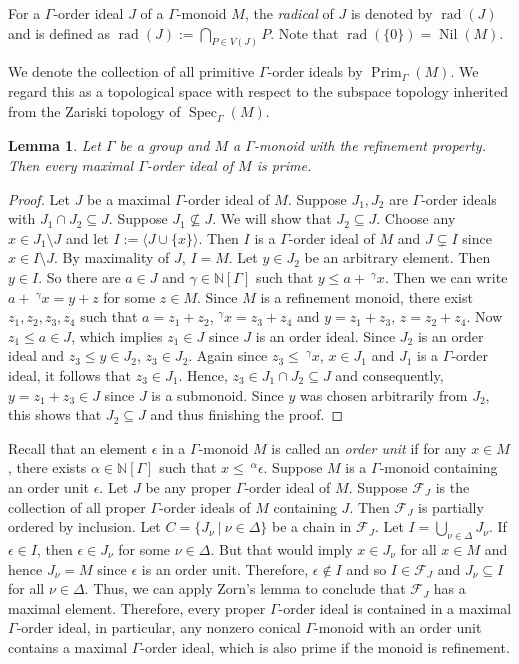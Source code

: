 \documentclass[a4paper,reqno,12pt]{amsart}
\numberwithin{equation}{section}
\newtheorem{lem}[thm]{Lemma}
\theoremstyle{definition}
\theoremstyle{remark}
\newcommand{\rad}{\operatorname{rad}}
\newcommand{\nil}{\operatorname{Nil}}
\newcommand{\Prim}{\operatorname{Prim}}
\newcommand{\Spec}{\operatorname{Spec}}
\begin{document}
For a $\Gamma$-order ideal $J$ of a $\Gamma$-monoid $M$, the \emph{radical} of $J$ is denoted by $\rad(J)$ and is defined as $\rad(J):=\displaystyle{\bigcap_{P\in V(J)}}P$. Note that $\rad(\{0\})=\nil(M)$. 

We denote the collection of all primitive $\Gamma$-order ideals by $\Prim_\Gamma(M)$. We regard this as a topological space with respect to the subspace topology inherited from the Zariski topology of $\Spec_\Gamma(M)$. 

\begin{lem}\label{lem maximal order ideal is prime}
Let $\Gamma$ be a group and $M$ a $\Gamma$-monoid with the refinement property. Then every maximal $\Gamma$-order ideal of $M$ is prime.    
\end{lem}
\begin{proof}
Let $J$ be a maximal $\Gamma$-order ideal of $M$. Suppose $J_1,J_2$ are $\Gamma$-order ideals with $J_1\cap J_2\subseteq J$. Suppose $J_1\nsubseteq J$. We will show that $J_2\subseteq J$. Choose any $x\in J_1\setminus J$ and let $I:=\langle J\cup \{x\}\rangle$. Then $I$ is a $\Gamma$-order ideal of $M$ and $J\subsetneq I$ since $x\in I\setminus J$. By maximality of $J$, $I=M$. Let $y\in J_2$ be an arbitrary element. Then $y\in I$. So there are $a\in J$ and $\gamma\in \mathbb{N}[\Gamma]$ such that $y\le a+~^\gamma x$. Then we can write $a+~^\gamma x=y+z$ for some $z\in M$. Since $M$ is a refinement monoid, there exist $z_1,z_2,z_3,z_4$ such that $a=z_1+z_2$, $^\gamma x=z_3+z_4$ and $y=z_1+z_3$, $z=z_2+z_4$. Now $z_1\le a\in J$, which implies $z_1\in J$ since $J$ is an order ideal. Since $J_2$ is an order ideal and $z_3\le y\in J_2$, $z_3\in J_2$. Again since $z_3\le~^\gamma x$, $x\in J_1$ and $J_1$ is a $\Gamma$-order ideal, it follows that $z_3\in J_1$. Hence, $z_3\in J_1\cap J_2\subseteq J$ and consequently, $y=z_1+z_3\in J$ since $J$ is a submonoid. Since $y$ was chosen arbitrarily from $J_2$, this shows that $J_2\subseteq J$ and thus finishing the proof. 
\end{proof}

Recall that an element $\epsilon$ in a $\Gamma$-monoid $M$ is called an \emph{order unit}
if for any $x\in M$, there exists $\alpha\in \mathbb{N}[\Gamma]$ such that $x\le~^\alpha \epsilon$. Suppose $M$ is a $\Gamma$-monoid containing an order unit $\epsilon$. Let $J$ be any proper $\Gamma$-order ideal of $M$. Suppose $\mathscr{F}_J$ is the collection of all proper $\Gamma$-order ideals of $M$ containing $J$. Then $\mathscr{F}_J$ is partially ordered by inclusion. Let $C=\{J_\nu~|~\nu\in \Delta\}$ be a chain in $\mathscr{F}_J$. Let $I=\displaystyle{\bigcup_{\nu\in \Delta}} J_\nu$. If $\epsilon\in I$, then $\epsilon\in J_\nu$ for some $\nu\in \Delta$. But that would imply $x\in J_{\nu}$ for all $x\in M$ and hence $J_{\nu}=M$ since $\epsilon$ is an order unit. Therefore, $\epsilon\notin I$ and so $I\in \mathscr{F}_J$ and $J_\nu\subseteq I$ for all $\nu\in \Delta$. Thus, we can apply Zorn's lemma to conclude that $\mathscr{F}_J$ has a maximal element. Therefore, every proper $\Gamma$-order ideal is contained in a maximal $\Gamma$-order ideal, in particular, any nonzero conical $\Gamma$-monoid with an order unit contains a maximal $\Gamma$-order ideal, which is also prime if the monoid is refinement.
\end{document}
